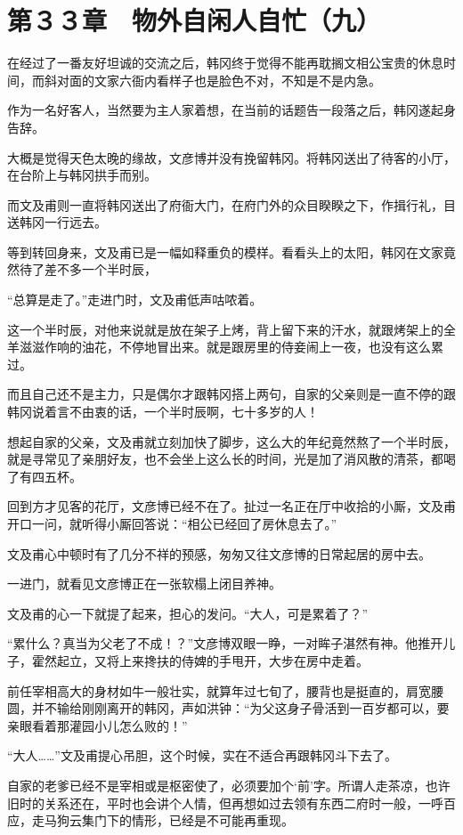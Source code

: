 \section{第３３章　物外自闲人自忙（九）}

在经过了一番友好坦诚的交流之后，韩冈终于觉得不能再耽搁文相公宝贵的休息时间，而斜对面的文家六衙内看样子也是脸色不对，不知是不是内急。

作为一名好客人，当然要为主人家着想，在当前的话题告一段落之后，韩冈遂起身告辞。

大概是觉得天色太晚的缘故，文彦博并没有挽留韩冈。将韩冈送出了待客的小厅，在台阶上与韩冈拱手而别。

而文及甫则一直将韩冈送出了府衙大门，在府门外的众目睽睽之下，作揖行礼，目送韩冈一行远去。

等到转回身来，文及甫已是一幅如释重负的模样。看看头上的太阳，韩冈在文家竟然待了差不多一个半时辰，

“总算是走了。”走进门时，文及甫低声咕哝着。

这一个半时辰，对他来说就是放在架子上烤，背上留下来的汗水，就跟烤架上的全羊滋滋作响的油花，不停地冒出来。就是跟房里的侍妾闹上一夜，也没有这么累过。

而且自己还不是主力，只是偶尔才跟韩冈搭上两句，自家的父亲则是一直不停的跟韩冈说着言不由衷的话，一个半时辰啊，七十多岁的人！

想起自家的父亲，文及甫就立刻加快了脚步，这么大的年纪竟然熬了一个半时辰，就是寻常见了亲朋好友，也不会坐上这么长的时间，光是加了消风散的清茶，都喝了有四五杯。

回到方才见客的花厅，文彦博已经不在了。扯过一名正在厅中收拾的小厮，文及甫开口一问，就听得小厮回答说：“相公已经回了房休息去了。”

文及甫心中顿时有了几分不祥的预感，匆匆又往文彦博的日常起居的房中去。

一进门，就看见文彦博正在一张软榻上闭目养神。

文及甫的心一下就提了起来，担心的发问。“大人，可是累着了？”

“累什么？真当为父老了不成！？”文彦博双眼一睁，一对眸子湛然有神。他推开儿子，霍然起立，又将上来搀扶的侍婢的手甩开，大步在房中走着。

前任宰相高大的身材如牛一般壮实，就算年过七旬了，腰背也是挺直的，肩宽腰圆，并不输给刚刚离开的韩冈，声如洪钟：“为父这身子骨活到一百岁都可以，要亲眼看着那灌园小儿怎么败的！”

“大人……”文及甫提心吊胆，这个时候，实在不适合再跟韩冈斗下去了。

自家的老爹已经不是宰相或是枢密使了，必须要加个‘前’字。所谓人走茶凉，也许旧时的关系还在，平时也会讲个人情，但再想如过去领有东西二府时一般，一呼百应，走马狗云集门下的情形，已经是不可能再重现。

